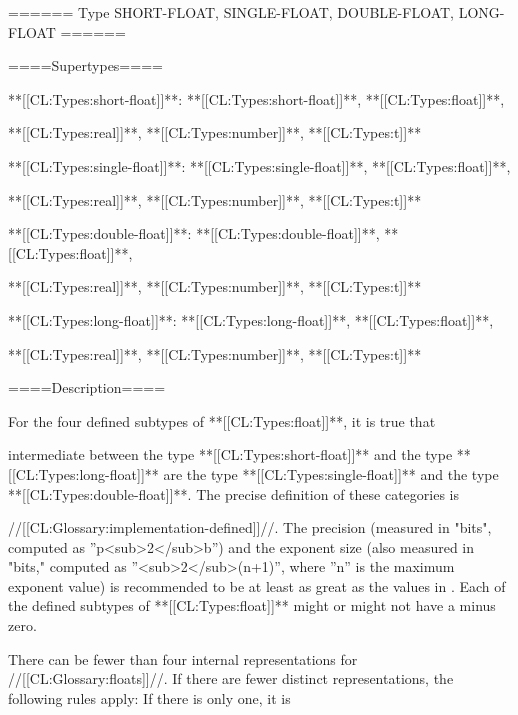 ====== Type SHORT-FLOAT, SINGLE-FLOAT, DOUBLE-FLOAT, LONG-FLOAT ======

====Supertypes====

**[[CL:Types:short-float]]**: **[[CL:Types:short-float]]**, **[[CL:Types:float]]**,

**[[CL:Types:real]]**, **[[CL:Types:number]]**, **[[CL:Types:t]]**

**[[CL:Types:single-float]]**: **[[CL:Types:single-float]]**, **[[CL:Types:float]]**,

**[[CL:Types:real]]**, **[[CL:Types:number]]**, **[[CL:Types:t]]**

**[[CL:Types:double-float]]**: **[[CL:Types:double-float]]**, **[[CL:Types:float]]**,

**[[CL:Types:real]]**, **[[CL:Types:number]]**, **[[CL:Types:t]]**

**[[CL:Types:long-float]]**: **[[CL:Types:long-float]]**, **[[CL:Types:float]]**,

**[[CL:Types:real]]**, **[[CL:Types:number]]**, **[[CL:Types:t]]**

====Description====

For the four defined subtypes of **[[CL:Types:float]]**, it is true that

intermediate between the type **[[CL:Types:short-float]]** and the type **[[CL:Types:long-float]]** are the type **[[CL:Types:single-float]]** and the type **[[CL:Types:double-float]]**. The precise definition of these categories is

//[[CL:Glossary:implementation-defined]]//. The precision (measured in "bits", computed as ''p\log<sub>2</sub>b'') and the exponent size (also measured in "bits," computed as ''\log<sub>2</sub>(n+1)'', where ''n'' is the maximum exponent value) is recommended to be at least as great as the values in \thenextfigure. Each of the defined subtypes of **[[CL:Types:float]]** might or might not have a minus zero.


There can be fewer than four internal representations for //[[CL:Glossary:floats]]//. If there are fewer distinct representations, the following rules apply: \beginlist \itemitem{--} If there is only one, it is

